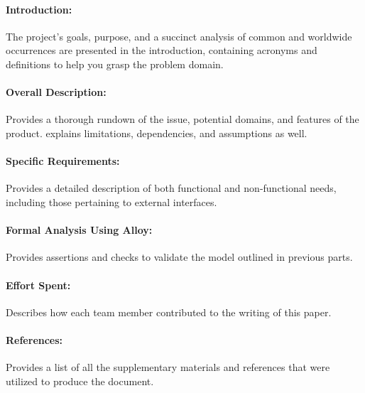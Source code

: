 \paragraph{Introduction:} The project's goals, purpose, and a succinct analysis of common and worldwide occurrences are presented in the introduction, containing acronyms and definitions to help you grasp the problem domain.

\paragraph{Overall Description:} Provides a thorough rundown of the issue, potential domains, and features of the product. explains limitations, dependencies, and assumptions as well.

\paragraph{Specific Requirements:} Provides a detailed description of both functional and non-functional needs, including those pertaining to external interfaces.

\paragraph{Formal Analysis Using Alloy:} Provides assertions and checks to validate the model outlined in previous parts.

\paragraph{Effort Spent:} Describes how each team member contributed to the writing of this paper.

\paragraph{References:} Provides a list of all the supplementary materials and references that were utilized to produce the document.